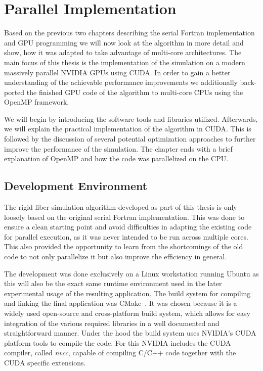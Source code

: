 \chapter{Parallel Implementation}
\label{cha:parallel_implementation}

Based on the previous two chapters describing the serial Fortran implementation and GPU programming we will now look at the algorithm in more detail and show, how it was adapted to take advantage of multi-core architectures. The main focus of this thesis is the implementation of the simulation on a modern massively parallel NVIDIA GPUs using CUDA. In order to gain a better understanding of the achievable performance improvements we additionally back-ported the finished GPU code of the algorithm to multi-core CPUs using the OpenMP framework.

We will begin by introducing the software tools and libraries utilized. Afterwards, we will explain the practical implementation of the algorithm in CUDA. This is followed by the discussion of several potential optimization approaches to further improve the performance of the simulation. The chapter ends with a brief explanation of OpenMP and how the code was parallelized on the CPU.

\section{Development Environment}

The rigid fiber simulation algorithm developed as part of this thesis is only loosely based on the original serial Fortran implementation. This was done to ensure a clean starting point and avoid difficulties in adapting the existing code for parallel execution, as it was never intended to be run across multiple cores. This also provided the opportunity to learn from the shortcomings of the old code to not only parallelize it but also improve the efficiency in general.

The development was done exclusively on a Linux workstation running Ubuntu as this will also be the exact same runtime environment used in the later experimental usage of the resulting application. The build system for compiling and linking the final application was CMake~\cite{CMake}. It was chosen because it is a widely used open-source and cross-platform build system, which allows for easy integration of the various required libraries in a well documented and straightforward manner. Under the hood the build system uses NVIDIA's CUDA platform tools to compile the code. For this NVIDIA includes the CUDA compiler, called \emph{nvcc}, capable of compiling C/C++ code together with the CUDA specific extensions.

